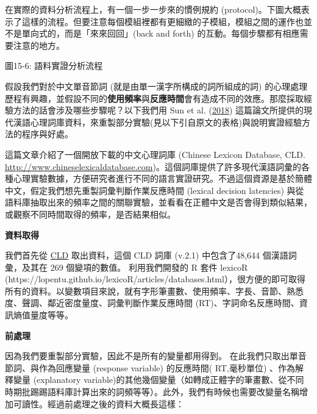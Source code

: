 在實際的資料分析流程上，有一個一步一步來的慣例規約 (protocol)。下圖大概表示了這樣的流程。但要注意每個模組裡都有更細緻的子模組，模組之間的運作也並不是單向式的，而是「來來回回」(back and forth) 的互動。每個步驟都有相應需要注意的地方。


圖15-6: 語料實證分析流程

假設我們對於中文單音節詞 (就是由單一漢字所構成的詞所組成的詞) 的心理處理歷程有興趣，並假設不同的\textbf{使用頻率}與\textbf{反應時間}會有造成不同的效應。那麼採取經驗方法的話會涉及哪些步驟呢？以下我們用 Sun et al. (\hyperlink{bookmarkid1mrcu09}{2018}) 這篇論文所提供的現代漢語心理詞庫資料，來重製部分實驗(見以下引自原文的表格)與說明實證經驗方法的程序與好處。

  
 

\citet{SunEtAl2018} 這篇文章介紹了一個開放下載的中文心理詞庫 (Chinese Lexicon Database, CLD.  \url{http://www.chineselexicaldatabase.com})。這個詞庫提供了許多現代漢語詞彙的各種心理實驗數據，方便研究者進行不同的語言實證研究。不過這個資源是基於簡體中文，假定我們想先重製詞彙判斷作業反應時間 (lexical decision latencies) 與從語料庫抽取出來的頻率之間的關聯實驗，並看看在正體中文是否會得到類似結果，或觀察不同時間取得的頻率，是否結果相似。

\textbf{資料取得}

我們首先從 \href{http://www.chineselexicaldatabase.com/}{CLD} 取出資料，這個 CLD 詞庫 (v.2.1) 中包含了48,644 個漢語詞彙，及其在 269 個變項的數值。 利用我們開發的 R 套件 lexicoR (https://lopentu.github.io/lexicoR/articles/databases.html），很方便的即可取得所有的資料。以變數項目來說，就有字形筆畫數、使用頻率、字長、音節、熟悉度、聲調、鄰近密度量度、詞彙判斷作業反應時間 (RT)、字詞命名反應時間、資訊熵值量度等等。 

\textbf{前處理}

因為我們要重製部分實驗，因此不是所有的變量都用得到。 在此我們只取出單音節詞、與作為回應變量 (response variable) 的反應時間( RT,毫秒單位) 、作為解釋變量 (explanatory variable)的其他幾個變量（如轉成正體字的筆畫數、從不同時期批踢踢語料庫計算出來的詞頻等等）。此外，我們有時候也需要改變量名稱增加可讀性。經過前處理之後的資料大概長這樣：

\tablefirsthead{}

